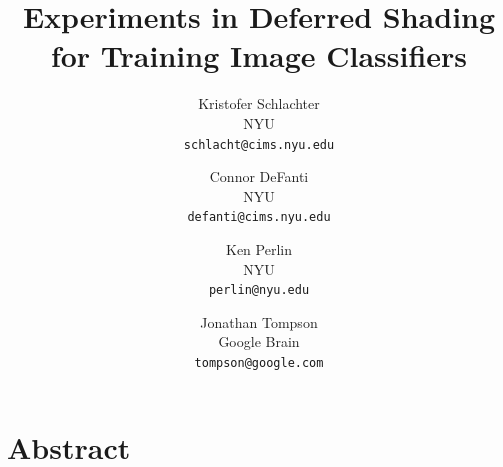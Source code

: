 \documentclass[10pt,twocolumn,letterpaper]{article}
\begin{document}
\title{Experiments in Deferred Shading for Training Image Classifiers}

\author{Kristofer Schlachter\\
NYU\\
{\tt\small schlacht@cims.nyu.edu}
\and
Connor DeFanti\\
NYU\\
{\tt\small defanti@cims.nyu.edu}
\and
Ken Perlin\\
NYU\\
{\tt\small perlin@nyu.edu}
\and
Jonathan Tompson\\
Google Brain\\
{\tt\small tompson@google.com}
}

\maketitle
\maketitle

\section{Abstract}
\end{document}
